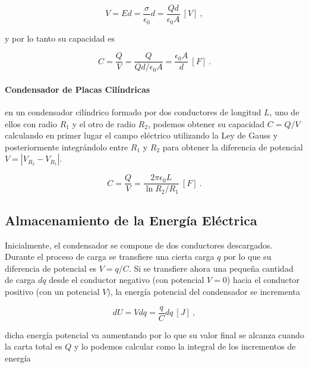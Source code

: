 \documentclass{tufte-handout}
\begin{document}
\begin{equation}
V = Ed = \frac{\sigma}{\epsilon_0}d = \frac{Qd}{\epsilon_0A}~[V]~,
\end{equation}

y por lo tanto su capacidad es

\begin{equation}
C = \frac{Q}{V} = \frac{Q}{Qd/\epsilon_0A} = \frac{\epsilon_0A}{d}~[F]~.
\end{equation}


\paragraph{Condensador de Placas Cilíndricas} en un condensador cilíndrico formado por dos conductores de longitud $L$, uno de ellos con radio $R_1$ y el otro de radio $R_2$, podemos obtener su capacidad $C = Q/V$ calculando en primer lugar el campo eléctrico utilizando la Ley de Gauss y posteriormente integrándolo entre $R_1$ y $R_2$ para obtener la diferencia de potencial $V = |V_{R_2} - V_{R_1}|$.

\begin{equation}
C = \frac{Q}{V} = \frac{2\pi\epsilon_0L}{\ln{R_2/R_1}}~[F]~.
\end{equation}

\subsection{Almacenamiento de la Energía Eléctrica}

Inicialmente, el condensador se compone de dos conductores descargados. Durante el proceso de carga se transfiere una cierta carga $q$ por lo que su diferencia de potencial es $V = q/C$. Si se transfiere ahora una pequeña cantidad de carga $dq$ desde el conductor negativo (con potencial $V=0$) hacia el conductor positivo (con un potencial $V$), la energía potencial del condensador se incrementa

\begin{equation}
dU = V dq = \frac{q}{C}dq~[J]~,
\end{equation}

dicha energía potencial va aumentando por lo que su valor final se alcanza cuando la carta total es $Q$ y lo podemos calcular como la integral de los incrementos de energía
\end{document}
